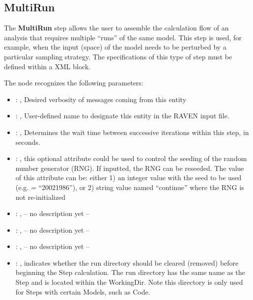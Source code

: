 

\subsection{MultiRun}
   The \textbf{MultiRun} step allows the user to assemble the calculation flow of an analysis that
  requires multiple ``runs'' of the same model. This step is used, for example, when the input
  (space) of the model needs to be perturbed by a particular sampling strategy. The specifications
  of this type of step must be defined within a  XML block.

  The  node recognizes the following parameters:
    \begin{itemize}
      \item {}: , 
        Desired verbosity of messages coming from this entity
      \item {}: , 
        User-defined name to designate this entity in the RAVEN input file.
      \item {}: , 
        Determines the wait time between successive iterations within this step, in seconds.
      \item {}: , 
         this optional attribute could be used to control the seeding of the random number generator
        (RNG). If inputted, the RNG can be reseeded. The value of this attribute can be: either 1)
        an integer value with the seed to be used (e.g.  = ``20021986''), or 2)
        string value named ``continue'' where the RNG is not re-initialized
      \item {}: , 
        -- no description yet --
      \item {}: , 
        -- no description yet --
      \item {}: , 
        -- no description yet --
      \item {}: , 
        indicates whether the run directory should be cleared (removed) before beginning
        the Step calculation. The run directory has the same name as the Step and is located
        within the WorkingDir. Note this directory is only used for Steps with certain Models,
        such as Code.               
  \end{itemize}

